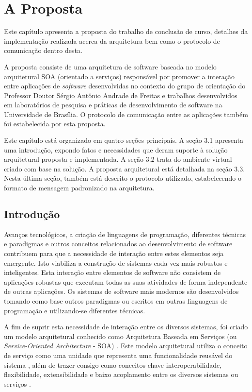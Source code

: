 \chapter[A Proposta]{A Proposta}

Este capítulo apresenta a proposta do trabalho de conclusão de curso, detalhes da implementação realizada acerca da arquitetura bem como o protocolo de comunicação dentro desta.

A proposta consiste de uma arquitetura de software baseada no modelo arquitetural SOA (orientado a serviços) responsável por promover a interação entre aplicações de \textit{software} desenvolvidas no contexto do grupo de orientação do Professor Doutor Sérgio Antônio Andrade de Freitas e trabalhos desenvolvidos em laboratórios de pesquisa e práticas de desenvolvimento de software na Universidade de Brasília. O protocolo de comunicação entre as aplicações também foi estabelecida por esta proposta.

Este capítulo está organizado em quatro seções principais. A seção 3.1 apresenta uma introdução, expondo fatos e necessidades que deram suporte à solução arquitetural proposta e implementada. A seção 3.2 trata do ambiente virtual criado com base na solução. A proposta arquitetural está detalhada na seção 3.3. Nesta última seção, também está descrito o protocolo utilizado, estabelecendo o formato de mensagem padronizado na arquitetura.

\section{Introdução}
Avanços tecnológicos, a criação de linguagens de programação, diferentes técnicas e paradigmas e outros conceitos relacionados ao desenvolvimento de software contribuem para que a necessidade de interação entre estes elementos seja emergente. Isto viabiliza a construção de sistemas cada vez mais robustos e inteligentes. Esta interação entre elementos de software não consistem de aplicações robustas que executam todas as suas atividades de forma independente de outras aplicações. Os sistemas de software mais modernos são desenvolvidos tomando como base outros paradigmas ou escritos em outras linguagens de programação e utilizando-se diferentes técnicas.

A fim de suprir esta necessidade de interação entre os diversos sistemas, foi criado um modelo arquitetural conhecido como Arquitetura Baseada em Serviços (ou \textit{Service-Oriented Architecture} - SOA) \cite{linthicum_soainrealworld_2007}. Este modelo arquitetural utiliza o conceito de serviço como uma unidade que representa uma funcionalidade reusável do sistema \cite{lewis_getting_2010}, além de trazer consigo como conceitos chave interoperabilidade, flexibilidade, extensibilidade e baixo acoplamento entre os diversos sistemas ou serviços \cite{josuttis_soa_2007}.

